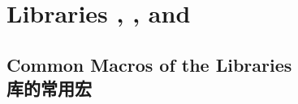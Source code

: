 \section{Libraries
  ,
  , and
  }\label{sec:listings}%
%

% 
% 




\subsection{Common Macros of the Libraries\\库的常用宏}









